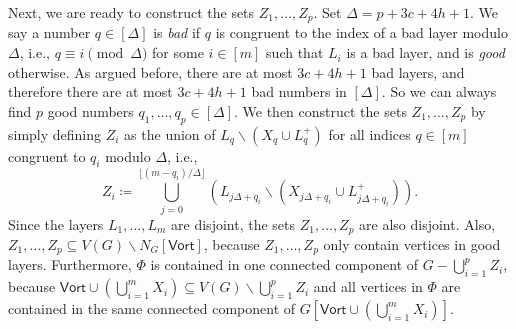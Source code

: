 \documentclass[a4paper,11pt]{article}
\numberwithin{lemma}{section}
\begin{document}
Next, we are ready to construct the sets $Z_1,\dots,Z_p$.
Set $\Delta = p+3c+4h+1$.
We say a number $q \in [\Delta]$ is \emph{bad} if $q$ is congruent to the index of a bad layer modulo $\Delta$, i.e., $q \equiv i \pmod{\Delta}$ for some $i \in [m]$ such that $L_i$ is a bad layer, and is \emph{good} otherwise.
As argued before, there are at most $3c+4h+1$ bad layers, and therefore there are at most $3c+4h+1$ bad numbers in $[\Delta]$.
So we can always find $p$ good numbers $q_1,\dots,q_p \in [\Delta]$.
We then construct the sets $Z_1,\dots,Z_p$ by simply defining $Z_i$ as the union of $L_q \backslash (X_q \cup L_q^+)$ for all indices $q \in [m]$ congruent to $q_i$ modulo $\Delta$, i.e.,
\begin{equation}
 \label{eq:zi}
 Z_i \coloneqq \bigcup_{j=0}^{\lfloor(m-q_i)/\Delta\rfloor} (L_{j\Delta+q_i} \backslash (X_{j\Delta+q_i} \cup L_{j\Delta+q_i}^+)).
\end{equation}
Since the layers $L_1,\dots,L_m$ are disjoint, the sets $Z_1,\dots,Z_p$ are also disjoint.
Also, $Z_1,\dots,Z_p \subseteq V(G) \backslash N_G[\mathsf{Vort}]$, because $Z_1,\dots,Z_p$ only contain vertices in good layers.
Furthermore, $\varPhi$ is contained in one connected component of $G - \bigcup_{i=1}^p Z_i$, because $\mathsf{Vort} \cup (\bigcup_{i=1}^m X_i) \subseteq V(G) \backslash \bigcup_{i=1}^p Z_i$ and all vertices in $\varPhi$ are contained in the same connected component of $G[\mathsf{Vort} \cup (\bigcup_{i=1}^m X_i)]$.
\end{document}
